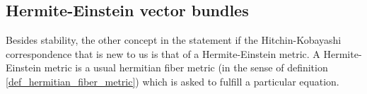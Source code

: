 
\subsection{Hermite-Einstein vector bundles}
Besides stability, the other concept in the statement if the Hitchin-Kobayashi correspondence that is new to us is that of a Hermite-Einstein metric. A Hermite-Einstein metric is a usual hermitian fiber metric (in the sense of definition \ref{def_hermitian_fiber_metric}) which is asked to fulfill a particular equation.


